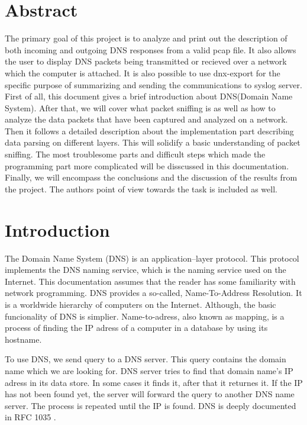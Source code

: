 \documentclass[11pt,a4paper]{article}
\begin{document}


\setlength{\parskip}{0pt}
\hypersetup{hidelinks}\tableofcontents
\setlength{\parskip}{0pt}

\newpage %

\section{Abstract}

The primary goal of this project is to analyze and print out the description of both incoming and outgoing DNS responses from a valid pcap file. It also allows the user to display DNS packets being transmitted or recieved over a network which the computer is attached. It is also possible to use dnx-export for the specific purpose of summarizing and sending the communications to syslog server. First of all, this document gives a brief introduction about DNS(Domain Name System). After that, we will cover what packet sniffing is as well as how to analyze the data packets that have been captured and analyzed on a network. Then it follows a detailed description about the implementation part describing data parsing on different layers. This will solidify a basic understanding of packet sniffing. The most troublesome parts and difficult steps which made the programming part more complicated will be disscussed in this documentation. Finally, we will encompass the conclusions and the discussion of the results from the project. The authors point of view towards the task is included as well.

\section{Introduction}

The Domain Name System (DNS) is an application–layer protocol. This protocol implements the DNS naming service, which is the naming service used on the Internet. This documentation assumes that the reader has some familiarity with network programming. DNS provides a so-called, Name-To-Address Resolution. It is a worldwide hierarchy of computers on the Internet. Although, the basic funcionality of DNS is simplier. Name-to-adress, also known as mapping, is a process of finding the IP adress of a computer in a database by using its hostname.

To use DNS, we send query to a DNS server. This query contains the domain name which we are looking for. DNS server tries to find that domain name's IP adress in its data store. In some cases it finds it, after that it returnes it. If the IP has not been found yet, the server will forward the query to another DNS name server. The process is repeated until the IP is found.\cite{DNS} DNS is deeply documented in RFC 1035 \cite{RFC1035}.
\end{document}
